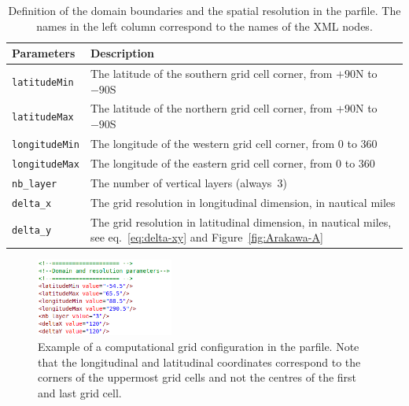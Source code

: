 \begin{table}[H]
\caption{Definition of the domain boundaries and the spatial resolution in the parfile. The names in the left column correspond to the names of the XML nodes.} 
  \begin{tabular}{p{3cm}p{12.5cm}}\hline
    {\bfseries Parameters} & {\bfseries Description}\\ \hline
    \texttt{latitudeMin} & The latitude of the southern grid cell corner, from $+90$N to $-90$S \\
    \texttt{latitudeMax} & The latitude of the northern grid cell corner, from $+90$N to $-90$S \\
    \texttt{longitudeMin} & The longitude of the western grid cell corner, from $0$ to $360$ \\
    \texttt{longitudeMax} & The longitude of the eastern grid cell corner, from $0$ to $360$ \\\hline
    
    \texttt{nb\_layer} & The number of vertical layers  (always~$3$) \\  \hline 
    \texttt{delta\_x} & The grid resolution in longitudinal dimension, in nautical miles \\ 
    \texttt{delta\_y} & The grid resolution in latitudinal dimension, in nautical miles, see eq.~\eqref{eq:delta-xy} and Figure~\ref{fig:Arakawa-A} \\  \hline
    \end{tabular}
\label{table:domain_space_parfile}
\end{table}


 \begin{figure}[t]
   \centering
   \includegraphics[width=0.4\textwidth]{chapter3/figs/domain_resolution_parameters.png}
   \caption{Example of a computational grid configuration in the parfile. Note that the longitudinal and latitudinal coordinates correspond to the corners of the uppermost grid cells and not the centres of the first and last grid cell.}
   \label{fig:domain_space_parfile}
 \end{figure}

